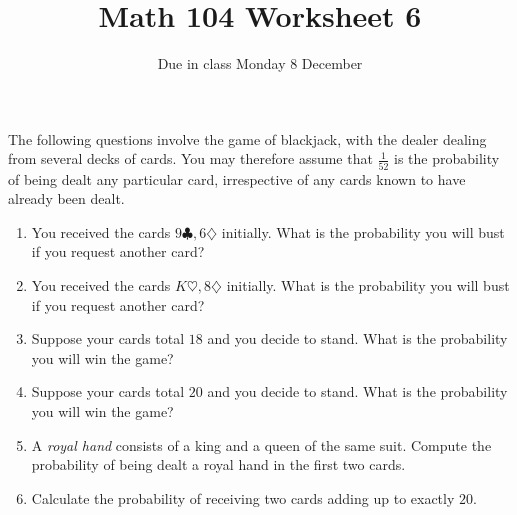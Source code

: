 \documentclass[12pt]{article}
\author{}\date{Due in class Monday 8 December}
\title{Math 104 Worksheet 6}\author{}
\begin{document}
\maketitle
\pagestyle{empty}
The following questions involve the game of blackjack,
with the dealer dealing from several decks of cards.
You may therefore assume that $\frac{1}{52}$ is the probability
of being dealt any particular card, irrespective of any cards
known to have already been dealt. 
\begin{enumerate}
\item You received the cards $9\clubsuit,6\diamondsuit$
initially. What is the probability you will bust if
you request another card?
\item You received the cards $K\heartsuit,8\diamondsuit$
initially. What is the probability you will bust if
you request another card?
\item Suppose your cards total $18$ and you decide to stand.
What is the probability you will win the game?
\item Suppose your cards total $20$ and you decide to stand.
What is the probability you will win the game?
\item A {\em royal hand} consists of a king and a queen
of the same suit. Compute the probability of being
dealt a royal hand in the first two cards.
\item Calculate the probability of receiving two
cards adding up to exactly $20$.
\end{enumerate}
\end{document}
